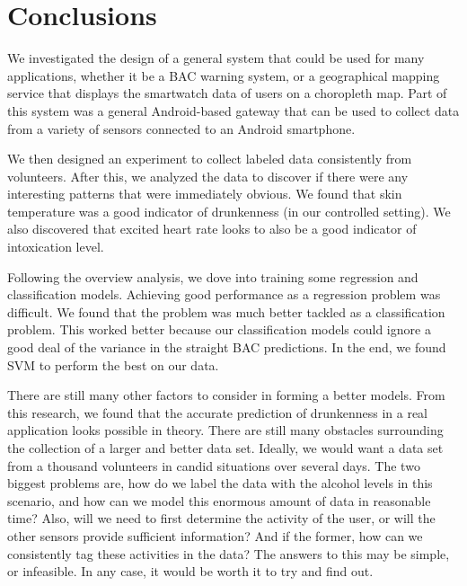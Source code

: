 \section{Conclusions}

We investigated the design of a general system that could be used for many applications, whether it be a BAC warning system, or a geographical mapping service that displays the smartwatch data of users on a choropleth map. Part of this system was a general Android-based gateway that can be used to collect data from a variety of sensors connected to an Android smartphone.

We then designed an experiment to collect labeled data consistently from volunteers. After this, we analyzed the data to discover if there were any interesting patterns that were immediately obvious. We found that skin temperature was a good indicator of drunkenness (in our controlled setting). We also discovered that excited heart rate looks to also be a good indicator of intoxication level.

Following the overview analysis, we dove into training some regression and classification models. Achieving good performance as a regression problem was difficult. We found that the problem was much better tackled as a classification problem. This worked better because our classification models could ignore a good deal of the variance in the straight BAC predictions. In the end, we found SVM to perform the best on our data.

There are still many other factors to consider in forming a better models. From this research, we found that the accurate prediction of drunkenness in a real application looks possible in theory. There are still many obstacles surrounding the collection of a larger and better data set. Ideally, we would want a data set from a thousand volunteers in candid situations over several days. The two biggest problems are, how do we label the data with the alcohol levels in this scenario, and how can we model this enormous amount of data in reasonable time? Also, will we need to first determine the activity of the user, or will the other sensors provide sufficient information? And if the former, how can we consistently tag these activities in the data? The answers to this may be simple, or infeasible. In any case, it would be worth it to try and find out.